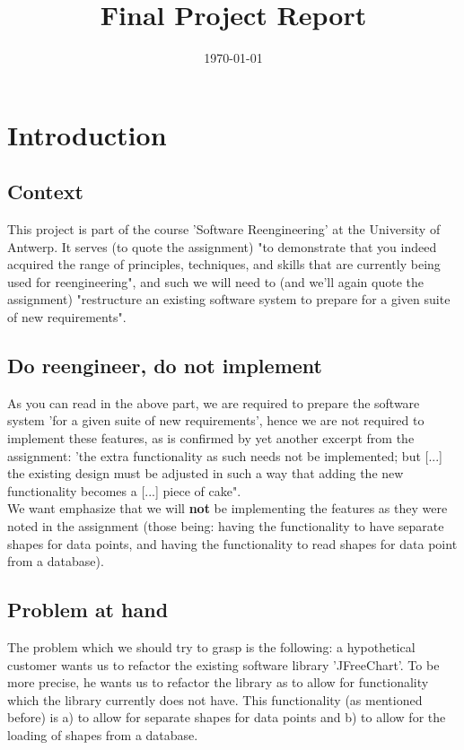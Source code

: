 \documentclass{article}
\title{\textmd{\textbf{Final Project Report}}\\\normalsize\vspace{0.1in}\Large{\projectnaam}}
\author{\student}\date{\today}
\begin{document}
\maketitle
\newpage

\section{Introduction}

\subsection{Context}

This project is part of the course 'Software Reengineering' at the University of Antwerp. It serves (to quote the assignment) "to demonstrate that you indeed acquired the range of principles, techniques, and skills that are currently being used for reengineering", and such we will need to (and we'll again quote the assignment) "restructure an existing software system to prepare for a given suite of new requirements".

\subsection{Do reengineer, do not implement}

As you can read in the above part, we are required to prepare the software system 'for a given suite of new requirements', hence we are not required to implement these features, as is confirmed by yet another excerpt from the assignment: 'the extra functionality as such needs not be implemented; but [...] the existing design must be adjusted in such a way that adding the new functionality becomes a [...] piece of cake".\\

We want emphasize that we will \textbf{not} be implementing the features as they were noted in the assignment (those being: having the functionality to have separate shapes for data points, and having the functionality to read shapes for data point from a database).

\subsection{Problem at hand} 

The problem which we should try to grasp is the following: a hypothetical customer wants us to refactor the existing software library 'JFreeChart'. To be more precise, he wants us to refactor the library as to allow for functionality which the library currently does not have. This functionality (as mentioned before) is a) to allow for separate shapes for data points and b) to allow for the loading of shapes from a database.
\end{document}
